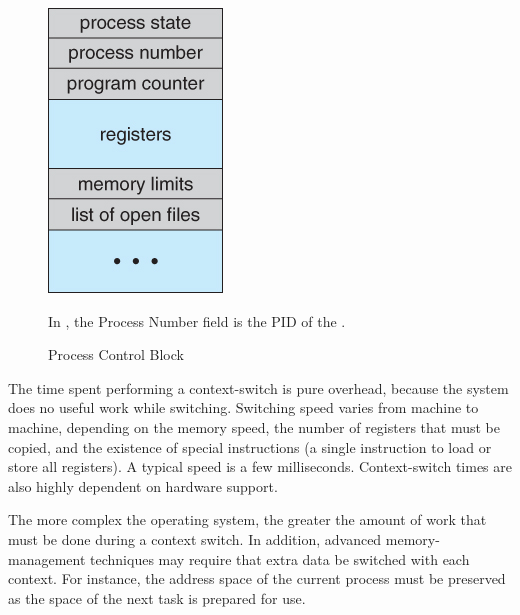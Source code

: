 \begin{figure}[h!tbp]
  \centering
  \includegraphics[scale=0.85]{./Drawings/EDAF35-Operating_Systems/Process_Control_Block.jpg}
  \caption{Process Control Block}
  \label{fig:Process_Control_Block}
  \begin{remark*}
    In , the Process Number field is the PID of the .
  \end{remark*}
\end{figure}

The time spent performing a context-switch is pure overhead, because the system does no useful work while switching.
Switching speed varies from machine to machine, depending on the memory speed, the number of registers that must be copied, and the existence of special instructions (a single instruction to load or store all registers).
A typical speed is a few milliseconds.
Context-switch times are also highly dependent on hardware support.

The more complex the operating system, the greater the amount of work that must be done during a context switch.
In addition, advanced memory-management techniques may require that extra data be switched with each context.
For instance, the address space of the current process must be preserved as the space of the next task is prepared for use.

